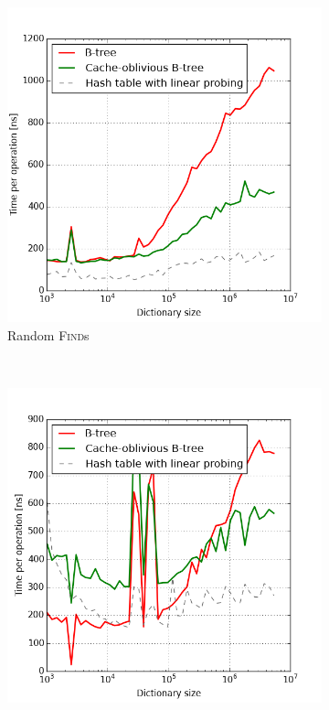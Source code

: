 \begin{figure}
\centering
\begin{subfigure}[b]{0.45\textwidth}
	\includegraphics[width=\textwidth]{img/performance/cob-performance-1}
	\caption{Random \textsc{Find}s}
\end{subfigure}
~
\begin{subfigure}[b]{0.45\textwidth}
	\includegraphics[width=\textwidth]{img/performance/cob-performance-2}

\end{subfigure}
\end{figure}
